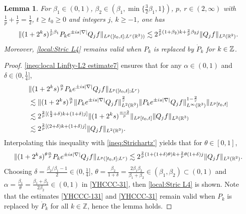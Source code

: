 \documentclass[11pt,twoside]{article}
\def\Z{\mathop{\mathbb Z\kern 0pt}\nolimits}
\def\R{\mathop{\mathbb R\kern 0pt}\nolimits}
\def\f{\frac}
\def\ls{\lesssim}
\newcommand{\pk}{\dot{P}_k}
\theoremstyle{plain}
\newtheorem{lemma}[theorem]{Lemma}
\theoremstyle{definition}
\numberwithin{equation}{section}
\begin{document}
	\begin{lemma}\label{lem:Localized Strichartz estimate L4}
		For $\beta_1\in(0,1)$, $\beta_2\in(\beta_1,\min\{\f32\beta_1,1\})$, $p,\ r\in(2,\infty)$ with $\f1p+\f1r=\f12$,
$t\ge t_0\ge 0$ and integers $j,\ k\ge -1$, one has
		\begin{equation}\label{local:Stric L4}
			\|(1+2^ks)^{\f1p \beta_1}P_{k}e^{\pm is|\nabla|}Q_jf\|_{L^p([t_0,t];L^r(\R^3))}
			\ls 2^{\f2p(1+\beta_2)k +\f2p\beta_2 j}\|Q_jf\|_{L^2(\R^2)}.
		\end{equation}
		Moreover, \eqref{local:Stric L4} remains valid when $P_k$ is replaced by $\pk$ for $k\in\Z$.
	\end{lemma}
	\begin{proof}
		\eqref{ineq:local Linfty-L2 estimate7} ensures that for any $\alpha\in(0,1)$ and $\delta\in(0,\f14]$,
		\begin{equation}\label{YHCCC-131}
			\begin{split}
				&\|(1+2^ks)^{\f\alpha p}P_{k}e^{\pm is|\nabla|}Q_jf\|_{L^p([t_0,t];L^r)}\\
				&\ls
				\|(1+2^ks)^{\f\alpha p}\|P_{k}e^{\pm is|\nabla|}Q_jf\|_{L^2(\R^3)}^{\f2r}\|P_{k}e^{\pm is|\nabla|}Q_jf\|_{L^\infty(\R^3)}^{1-\f2r}\|_{L^p[t_0,t]}\\
				&\ls
				2^{\f2p[(\f52+\delta)k+(1+\delta)j]}\|(1+2^ks)^{\f{\alpha-2}{p} }\|_{L^p[t_0,t]}\|Q_jf\|_{L^2(\R^3)}\\
				&\ls
				2^{\f2p[(2+\delta)k+(1+\delta)j]}\|Q_jf\|_{L^2(\R^3)}.
			\end{split}
		\end{equation}
		Interpolating this inequality with \eqref{ineq:Strichartz'} yields that for $\theta\in[0,1]$,
	\begin{equation}\label{YHCCC-31}
        \begin{split}
			\|(1+2^ks)^{\theta\f\alpha p}P_{k}e^{\pm is|\nabla|}Q_jf\|_{L^p([t_0,t];L^r)}
			\ls 2^{\f2p(1+(1+\delta)\theta)k+\f2p\theta(1+\delta) j}\|Q_jf\|_{L^2(\R^2)}.
         \end{split}
		\end{equation}
Choosing $\delta=\f{\beta_2/\beta_1-1}{2}\in(0,\f14]$, $\theta = \f{\beta_2}{1+\delta} = \f{2\beta_1\beta_2}{\beta_1+\beta_2}\in(\beta_1,\beta_2)\subset(0,1)$ and $\alpha=\f{\beta_1}{\theta}=\f{\beta_1+\beta_2}{2\beta_2}\in(0,1)$
in \eqref{YHCCC-31}, then \eqref{local:Stric L4} is shown. Note that the estimates \eqref{YHCCC-131} and \eqref{YHCCC-31}
remain valid when $P_k$ is replaced by $\pk$ for all $k\in\mathbb{Z}$, hence the lemma holds.
	\end{proof}
\end{document}
